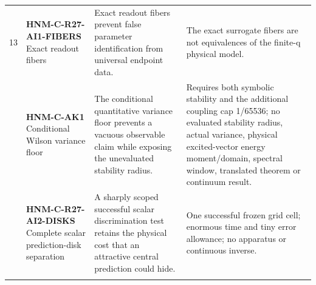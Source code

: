 \begin{longtable}{@{}p{8mm}p{44mm}p{53mm}p{43mm}@{}}
13 & \textbf{HNM-C-R27-AI1-FIBERS} Exact readout fibers & Exact readout fibers prevent false parameter identification from universal endpoint data. & The exact surrogate fibers are not equivalences of the finite-q physical model.\\\addlinespace
14 & \textbf{HNM-C-AK1} Conditional Wilson variance floor & The conditional quantitative variance floor prevents a vacuous observable claim while exposing the unevaluated stability radius. & Requires both symbolic stability and the additional coupling cap 1/65536; no evaluated stability radius, actual variance, physical excited-vector energy moment/domain, spectral window, translated theorem or continuum result.\\\addlinespace
15 & \textbf{HNM-C-R27-AI2-DISKS} Complete scalar prediction-disk separation & A sharply scoped successful scalar discrimination test retains the physical cost that an attractive central prediction could hide. & One successful frozen grid cell; enormous time and tiny error allowance; no apparatus or continuous inverse.\\\addlinespace
\bottomrule\end{longtable}\endgroup
